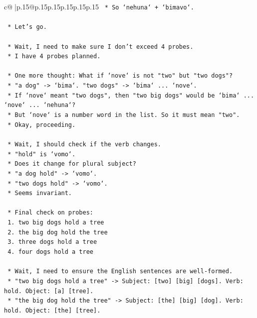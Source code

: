 \documentclass{article}
\begin{document}
{\begin{supertabular}{c@{$\;$}|p{.15\linewidth}@{}p{.15\linewidth}p{.15\linewidth}p{.15\linewidth}p{.15\linewidth}p{.15\linewidth}}
{{{\texttt{    *   So `nehuna` + `bimavo`.} \\
\\ 
\texttt{    *   Let's go.} \\
\\ 
\texttt{    *   Wait, I need to make sure I don't exceed 4 probes.} \\
\texttt{    *   I have 4 probes planned.} \\
\\ 
\texttt{    *   One more thought: What if `nove` is not "two" but "two dogs"?} \\
\texttt{    *   "a dog" {-}> `bima`. "two dogs" {-}> `bima` ... `nove`.} \\
\texttt{    *   If `nove` meant "two dogs", then "two big dogs" would be `bima` ... `nove` ... `nehuna`?} \\
\texttt{    *   But `nove` is a number word in the list. So it must mean "two".} \\
\texttt{    *   Okay, proceeding.} \\
\\ 
\texttt{    *   Wait, I should check if the verb changes.} \\
\texttt{    *   "hold" is `vomo`.} \\
\texttt{    *   Does it change for plural subject?} \\
\texttt{    *   "a dog hold" {-}> `vomo`.} \\
\texttt{    *   "two dogs hold" {-}> `vomo`.} \\
\texttt{    *   Seems invariant.} \\
\\ 
\texttt{    *   Final check on probes:} \\
\texttt{        1.  two big dogs hold a tree} \\
\texttt{        2.  the big dog hold the tree} \\
\texttt{        3.  three dogs hold a tree} \\
\texttt{        4.  four dogs hold a tree} \\
\\ 
\texttt{    *   Wait, I need to ensure the English sentences are well{-}formed.} \\
\texttt{    *   "two big dogs hold a tree" {-}> Subject: {[}two{]} {[}big{]} {[}dogs{]}. Verb: hold. Object: {[}a{]} {[}tree{]}.} \\
\texttt{    *   "the big dog hold the tree" {-}> Subject: {[}the{]} {[}big{]} {[}dog{]}. Verb: hold. Object: {[}the{]} {[}tree{]}.} \\
}}}
\end{supertabular}}
\end{document}
